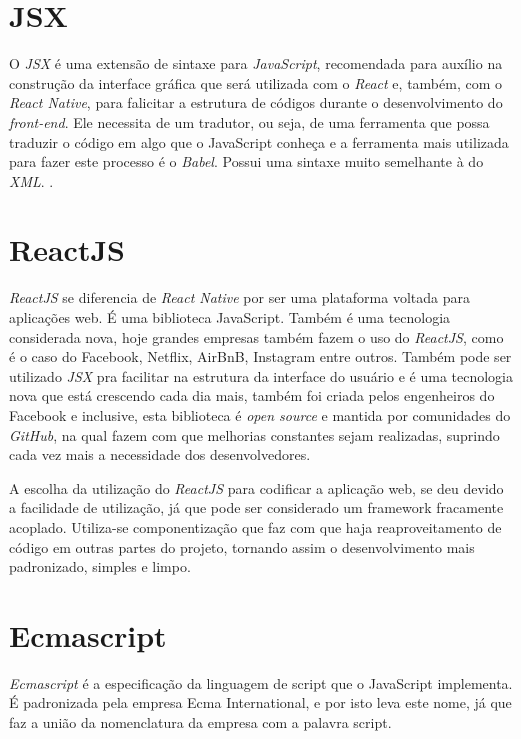 \section{JSX}
O \textit{JSX} é uma extensão de sintaxe para \textit{JavaScript}, recomendada para auxílio na construção da interface gráfica que será utilizada com o \textit{React} e, também, com o \textit{React Native}, para falicitar a estrutura de códigos durante o desenvolvimento do \textit{front-end}. Ele necessita de um tradutor, ou seja, de uma ferramenta que possa traduzir o código em algo que o JavaScript conheça e a ferramenta mais utilizada para fazer este processo é o \textit{Babel}. Possui uma sintaxe muito semelhante à do \textit{XML}.  
\cite{jsx}.


\section{ReactJS}
\textit{ReactJS} se diferencia de \textit{React Native} por ser uma plataforma voltada para aplicações web. É uma biblioteca JavaScript. Também é uma tecnologia considerada nova, hoje grandes empresas também fazem o uso do \textit{ReactJS}, como é o caso do Facebook, Netflix, AirBnB, Instagram entre outros. Também pode ser utilizado \textit{JSX} pra facilitar na estrutura da interface do usuário e é uma tecnologia nova que está crescendo cada dia mais, também foi criada pelos engenheiros do Facebook e inclusive, esta biblioteca é \textit{open source} e mantida por comunidades do \textit{GitHub}, na qual fazem com que melhorias constantes sejam realizadas, suprindo cada vez mais a necessidade dos desenvolvedores. \cite{react}

A escolha da utilização do \textit{ReactJS} para codificar a aplicação web, se deu devido a facilidade de utilização, já que pode ser considerado um framework fracamente acoplado. Utiliza-se componentização que faz com que haja reaproveitamento de código em outras partes do projeto, tornando assim o desenvolvimento mais padronizado, simples e limpo.

\section{Ecmascript}

\textit{Ecmascript} é a especificação da linguagem de script que o JavaScript implementa. É padronizada pela empresa Ecma International, e por isto leva este nome, já que faz a união da nomenclatura da empresa com a palavra script.\cite{ecma}

